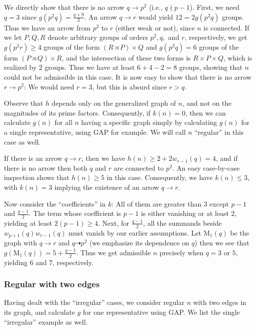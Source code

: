 \documentclass{article}
\newcommand{\m}[1]{\text{M}_{#1}}
\theoremstyle{plain}
\theoremstyle{definition}
\begin{document}
We directly show that there is no arrow $q \rightarrow p^2$ (i.e., $q \nmid p - 1$). First, we need $q = 3$ since $g(p^2 q) = \frac{q + 9}{2}$. An arrow $q \rightarrow r$ would yield $12 = 2g(p^2 q)$ groups. Thus we have an arrow from $p^2$ to $r$ (either weak or not), since $n$ is connected. If we let $P, Q, R$ denote arbitrary groups of orders $p^2, q,$ and $r$, respectively, we get $g(p^2 r) \ge 4$ groups of the form $(R \rtimes P) \times Q$ and $g(p^2 q) = 6$ groups of the form $(P \rtimes Q) \times R$, and the intersection of these two forms is $R \times P \times Q$, which is realized by $2$ groups. Thus we have at least $6 + 4 - 2 = 8$ groups, showing that $n$ could not be admissible in this case. It is now easy to show that there is no arrow $r \rightarrow p^2$: We would need $r = 3$, but this is absurd since $r > q$.

Observe that $h$ depends only on the generalized graph of $n$, and not on the magnitudes of its prime factors. Consequently, if $k(n) = 0$, then we can calculate $g(n)$ for all $n$ having a specific graph simply by calculating $g(n)$ for a single representative, using GAP for example. We will call $n$ ``regular'' in this case as well.

If there is an arrow $q \rightarrow r$, then we have $h(n) \ge 2 + 2w_{r - 1}(q) = 4$, and if there is no arrow then both $q$ and $r$ are connected to $p^2$. An easy case-by-case inspection shows that $h(n) \ge 5$ in this case. Consequently, we have $k(n) \le 3$, with $k(n) = 3$ implying the existence of an arrow $q \rightarrow r$.

Now consider the ``coefficients'' in $k$: All of them are greater than $3$ except $p - 1$ and $\frac{q - 1}{2}$. The term whose coefficient is $p - 1$ is either vanishing or at least $2$, yielding at least $2(p - 1) \ge 4$. Next, for $\frac{q - 1}{2}$, all the summands beside $w_{p + 1}(q)w_{r - 1}(q)$ must vanish by our earlier assumptions. Let $\m1(q)$ be the graph with $q \rightarrow r$ and $q \dashrightarrow p^2$ (we emphasize its dependence on $q$) then we see that $g(\m1(q)) = 5 + \frac{q - 1}{2}$. Thus we get admissible $n$ precisely when $q = 3$ or $5$, yielding $6$ and $7$, respectively.

\subsubsection*{Regular  with two edges}
Having dealt with the ``irregular'' cases, we consider regular $n$ with two edges in its graph, and calculate $g$ for one representative using GAP. We list the single ``irregular'' example as well.
\end{document}
